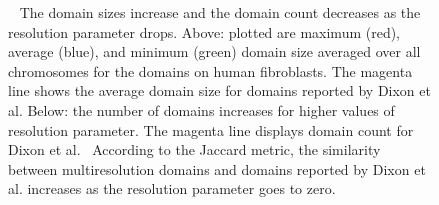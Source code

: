 \documentclass[12pt]{cmuthesis}
\begin{document}
  \begin{figure}[t]
    \centering
    \caption{~ The domain sizes increase and the domain count decreases as the resolution parameter drops. Above: plotted are maximum (red), average (blue), and minimum (green) domain size averaged over all chromosomes for the domains on human fibroblasts. The magenta line shows the average domain size for domains reported by Dixon et al. Below: the number of domains increases for higher values of resolution parameter. The magenta line displays domain count for Dixon et al.~ According to the Jaccard metric, the similarity between multiresolution domains and domains reported by Dixon et al. increases as the resolution parameter goes to zero.}%
    \label{fig:dom_size}
  \end{figure}
\end{document}
